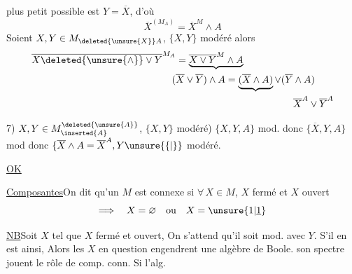 plus petit possible est $Y=\overline X$, d'où 
\[
\overline X^{(M_A)}=\overline X^M\wedge A
\]
Soient $X,Y\in M_{\deleted{\unsure{X}}A}$, $\{X,Y\}$ modéré\unsure{)|,} alors
\[
\begin{aligned}
\overline{X\deleted{\unsure{\wedge}}\vee Y}^{M_A}
   &=\underbrace{\overline{X\vee Y}^M\wedge A}\\
   &\hspace{-.4em}(\overline X\vee\overline Y)\wedge A
       =\underbrace{(\overline X\wedge A)}\vee(\overline Y\wedge A)\\
   &\hspace{12em}\overline X^A\vee\overline Y^A
\end{aligned}
\]

7) $X,Y\in M_{\inserted{A}}^{\deleted{\unsure{A}}}$, $\{X,Y\}$ modéré)   $\{X,Y,A\}$ mod. donc $\{\overline X,Y,A\}$ mod donc $\{\overline X\wedge A=\overline X^A,Y\unsure{\{|\}}$ modéré.

\uline{OK}

\uline{Composantes}\qquad On dit qu'un $M$ est connexe si  $\forall\,X\in M$, $X$ fermé et $X$ ouvert
\[
\Longrightarrow\quad X=\varnothing\quad\text{ou}\quad X=\unsure{1|\underline{1}}
\]

\uline{NB}\qquad Soit $X$ tel que $X$ fermé et ouvert, On s'attend qu'il soit mod. avec  $Y$. S'il en est ainsi, Alors les $X$ en question engendrent une algèbre de Boole.    son spectre jouent le rôle de comp. conn. Si l'alg.
